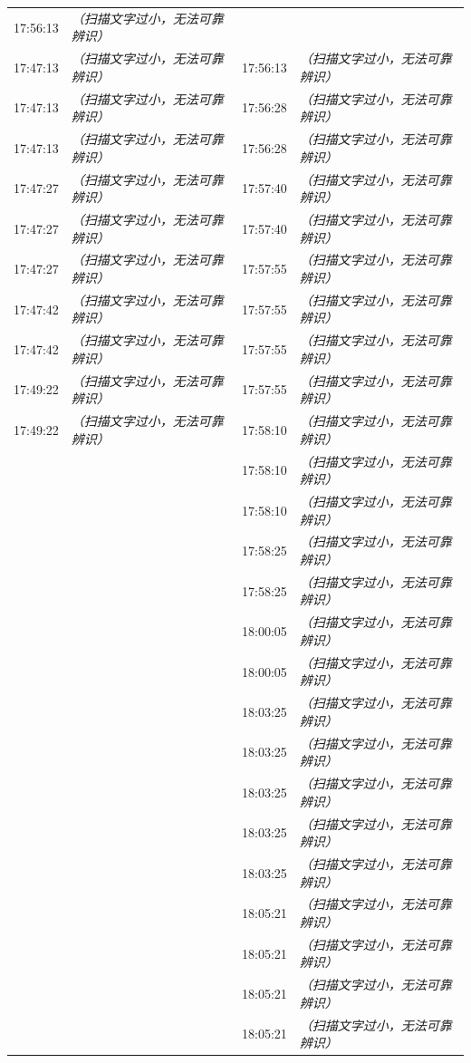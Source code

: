 \documentclass[UTF8,10pt,a4paper,fontset=fandol]{ctexart}
\begin{document}
\begin{center}
\begin{tabularx}{\textwidth}{@{}lX@{\qquad}lX@{}}
17:56:13 & \textit{（扫描文字过小，无法可靠辨识）} \\[1pt]
17:47:13 & \textit{（扫描文字过小，无法可靠辨识）} &
17:56:13 & \textit{（扫描文字过小，无法可靠辨识）} \\[1pt]
17:47:13 & \textit{（扫描文字过小，无法可靠辨识）} &
17:56:28 & \textit{（扫描文字过小，无法可靠辨识）} \\[1pt]
17:47:13 & \textit{（扫描文字过小，无法可靠辨识）} &
17:56:28 & \textit{（扫描文字过小，无法可靠辨识）} \\[1pt]
17:47:27 & \textit{（扫描文字过小，无法可靠辨识）} &
17:57:40 & \textit{（扫描文字过小，无法可靠辨识）} \\[1pt]
17:47:27 & \textit{（扫描文字过小，无法可靠辨识）} &
17:57:40 & \textit{（扫描文字过小，无法可靠辨识）} \\[1pt]
17:47:27 & \textit{（扫描文字过小，无法可靠辨识）} &
17:57:55 & \textit{（扫描文字过小，无法可靠辨识）} \\[1pt]
17:47:42 & \textit{（扫描文字过小，无法可靠辨识）} &
17:57:55 & \textit{（扫描文字过小，无法可靠辨识）} \\[1pt]
17:47:42 & \textit{（扫描文字过小，无法可靠辨识）} &
17:57:55 & \textit{（扫描文字过小，无法可靠辨识）} \\[1pt]
17:49:22 & \textit{（扫描文字过小，无法可靠辨识）} &
17:57:55 & \textit{（扫描文字过小，无法可靠辨识）} \\[1pt]
17:49:22 & \textit{（扫描文字过小，无法可靠辨识）} &
17:58:10 & \textit{（扫描文字过小，无法可靠辨识）} \\[1pt]
 & &
17:58:10 & \textit{（扫描文字过小，无法可靠辨识）} \\[1pt]
 & &
17:58:10 & \textit{（扫描文字过小，无法可靠辨识）} \\[1pt]
 & &
17:58:25 & \textit{（扫描文字过小，无法可靠辨识）} \\[1pt]
 & &
17:58:25 & \textit{（扫描文字过小，无法可靠辨识）} \\[1pt]
 & &
18:00:05 & \textit{（扫描文字过小，无法可靠辨识）} \\[1pt]
 & &
18:00:05 & \textit{（扫描文字过小，无法可靠辨识）} \\[1pt]
 & &
18:03:25 & \textit{（扫描文字过小，无法可靠辨识）} \\[1pt]
 & &
18:03:25 & \textit{（扫描文字过小，无法可靠辨识）} \\[1pt]
 & &
18:03:25 & \textit{（扫描文字过小，无法可靠辨识）} \\[1pt]
 & &
18:03:25 & \textit{（扫描文字过小，无法可靠辨识）} \\[1pt]
 & &
18:03:25 & \textit{（扫描文字过小，无法可靠辨识）} \\[1pt]
 & &
18:05:21 & \textit{（扫描文字过小，无法可靠辨识）} \\[1pt]
 & &
18:05:21 & \textit{（扫描文字过小，无法可靠辨识）} \\[1pt]
 & &
18:05:21 & \textit{（扫描文字过小，无法可靠辨识）} \\[1pt]
 & &
18:05:21 & \textit{（扫描文字过小，无法可靠辨识）} \\
\end{tabularx}
\end{center}
\end{document}
